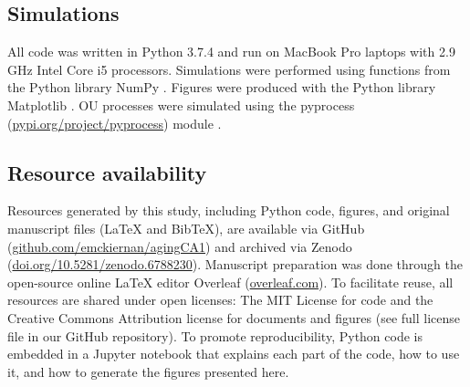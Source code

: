 \documentclass[12pt]{article}
\begin{document}
\subsection{Simulations}
All code was written in Python 3.7.4 and run on MacBook Pro laptops with 2.9 GHz Intel Core i5 processors. Simulations were performed using functions from the Python library NumPy \cite{numpyHarris2020}. Figures were produced with the Python library Matplotlib \cite{hunter2007matplotlib}. OU processes were simulated using the pyprocess (\href{https://pypi.org/project/pyprocess/}{pypi.org/project/pyprocess}) module \citep{mondaca200PyProcess}.

\subsection{Resource availability}
Resources generated by this study, including Python code, figures, and original manuscript files ({\LaTeX} and BibTeX), are available via GitHub (\href{https://github.com/emckiernan/agingCA1}{github.com/emckiernan/agingCA1}) and archived via Zenodo (\href{https://doi.org/10.5281/zenodo.6788230}{doi.org/10.5281/zenodo.6788230}). Manuscript preparation was done through the open-source online {\LaTeX} editor Overleaf (\href{https://www.overleaf.com/}{overleaf.com}). To facilitate reuse, all resources are shared under open licenses: The MIT License for code and the Creative Commons Attribution license for documents and figures (see full license file in our GitHub repository). To promote reproducibility, Python code is embedded in a Jupyter notebook \cite{perez2007ipython,kluyver2016jupyter} that explains each part of the code, how to use it, and how to generate the figures presented here.
\end{document}
